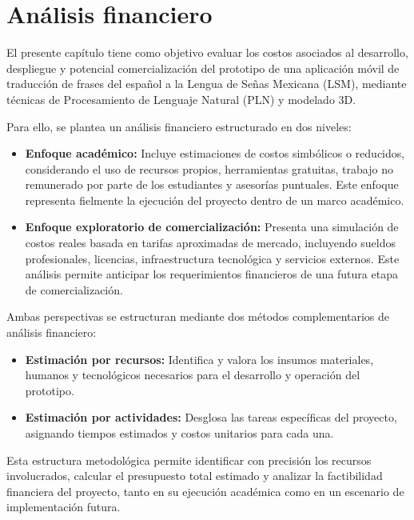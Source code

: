 \chapter{Análisis financiero}

El presente capítulo tiene como objetivo evaluar los costos asociados al desarrollo, despliegue y potencial comercialización del prototipo de una aplicación móvil de traducción de frases del español a la Lengua de Señas Mexicana (LSM), mediante técnicas de Procesamiento de Lenguaje Natural (PLN) y modelado 3D.

Para ello, se plantea un análisis financiero estructurado en dos niveles: 

\begin{itemize}
	\item \textbf{Enfoque académico:} Incluye estimaciones de costos simbólicos o reducidos, considerando el uso de recursos propios, herramientas gratuitas, trabajo no remunerado por parte de los estudiantes y asesorías puntuales. Este enfoque representa fielmente la ejecución del proyecto dentro de un marco académico.
	
	\item \textbf{Enfoque exploratorio de comercialización:} Presenta una simulación de costos reales basada en tarifas aproximadas de mercado, incluyendo sueldos profesionales, licencias, infraestructura tecnológica y servicios externos. Este análisis permite anticipar los requerimientos financieros de una futura etapa de comercialización.
\end{itemize}

Ambas perspectivas se estructuran mediante dos métodos complementarios de análisis financiero:

\begin{itemize}
	\item \textbf{Estimación por recursos:} Identifica y valora los insumos materiales, humanos y tecnológicos necesarios para el desarrollo y operación del prototipo.
	\item \textbf{Estimación por actividades:} Desglosa las tareas específicas del proyecto, asignando tiempos estimados y costos unitarios para cada una.
\end{itemize}

Esta estructura metodológica permite identificar con precisión los recursos involucrados, calcular el presupuesto total estimado y analizar la factibilidad financiera del proyecto, tanto en su ejecución académica como en un escenario de implementación futura.




